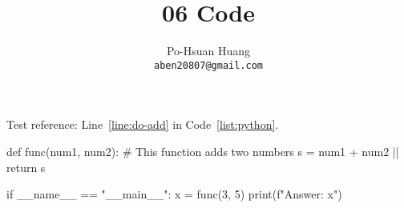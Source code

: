 \documentclass[12pt, a4paper]{article}
\title{06 Code}
\author{Po-Hsuan Huang\\ 
    \texttt{aben20807@gmail.com}
}
\begin{document}
\maketitle

Test reference:  Line~\ref{line:do-add} in Code~\ref{list:python}.

\begin{python}[
    float,floatplacement=ht,
    caption={Simple python code.},
    label=list:python,
    escapechar=|]
def func(num1, num2):
    # This function adds two numbers
    s = num1 + num2 |\label{line:do-add}|
    return s

if __name__ == "__main__":
    x = func(3, 5)
    print(f"Answer: {x}")
\end{python}
\end{document}
